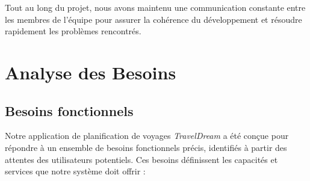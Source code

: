 \documentclass[a4paper,12pt]{article}
\begin{document}
Tout au long du projet, nous avons maintenu une communication constante entre les membres de l'équipe pour assurer la cohérence du développement et résoudre rapidement les problèmes rencontrés.


\section{Analyse des Besoins}

\subsection{Besoins fonctionnels}

Notre application de planification de voyages \textit{TravelDream} a été conçue pour répondre à un ensemble de besoins fonctionnels précis, identifiés à partir des attentes des utilisateurs potentiels. Ces besoins définissent les capacités et services que notre système doit offrir :
\end{document}
